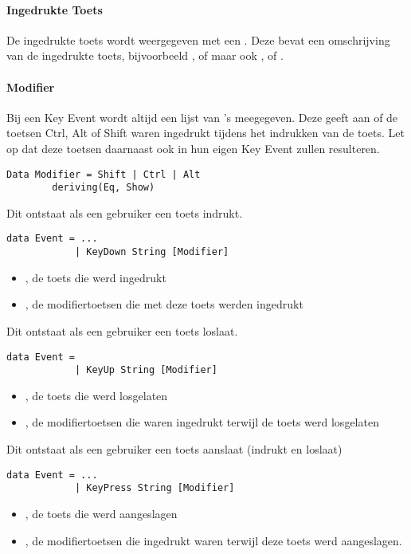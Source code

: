 \paragraph{Ingedrukte Toets}
De ingedrukte toets wordt weergegeven met een . Deze bevat een omschrijving van de ingedrukte toets, bijvoorbeeld ,  of  maar ook ,  of .

\paragraph{Modifier}
Bij een Key Event wordt altijd een lijst van 's meegegeven. Deze geeft aan of de toetsen Ctrl, Alt of Shift waren ingedrukt tijdens het indrukken van de toets. Let op dat deze toetsen daarnaast ook in hun eigen Key Event zullen resulteren.
\begin{lstlisting}
Data Modifier = Shift | Ctrl | Alt
		deriving(Eq, Show)
\end{lstlisting}

Dit  ontstaat als een gebruiker een toets indrukt.
\begin{lstlisting}
data Event = ...
			| KeyDown String [Modifier]
\end{lstlisting}
\begin{itemize}
	\item {}, de toets die werd ingedrukt
	\item \type{[Modifier]}, de modifiertoetsen die met deze toets werden ingedrukt
\end{itemize}

Dit  ontstaat als een gebruiker een toets loslaat.
\begin{lstlisting}
data Event =
			| KeyUp String [Modifier]
\end{lstlisting}
\begin{itemize}
	\item {}, de toets die werd losgelaten
	\item \type{[Modifier]}, de modifiertoetsen die waren ingedrukt terwijl de toets werd losgelaten
\end{itemize}

Dit  ontstaat als een gebruiker een toets aanslaat (indrukt en loslaat)
\begin{lstlisting}
data Event = ...
			| KeyPress String [Modifier]
\end{lstlisting}
\begin{itemize}
	\item {}, de toets die werd aangeslagen
	\item \type{[Modifier]}, de modifiertoetsen die ingedrukt waren terwijl deze toets werd aangeslagen.
\end{itemize}

